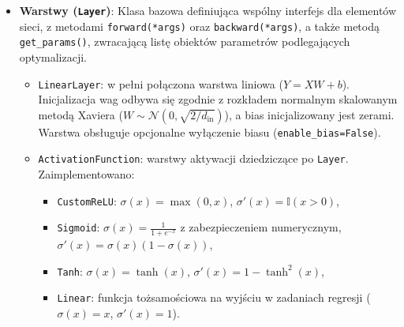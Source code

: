 \documentclass[11pt,a4paper]{article}
\begin{document}
\begin{itemize}
    \item \textbf{Warstwy (\texttt{Layer})}: Klasa bazowa definiująca wspólny interfejs dla elementów sieci, z metodami \texttt{forward(*args)} oraz \texttt{backward(*args)}, a także metodą \texttt{get\_params()}, zwracającą listę obiektów parametrów podlegających optymalizacji.
    \begin{itemize}
        \item \texttt{LinearLayer}: w pełni połączona warstwa liniowa ($Y = XW + b$). Inicjalizacja wag odbywa się zgodnie z rozkładem normalnym skalowanym metodą Xaviera ($W \sim \mathcal{N}(0, \sqrt{2/d_{\text{in}}})$), a bias inicjalizowany jest zerami. Warstwa obsługuje opcjonalne wyłączenie biasu (\texttt{enable\_bias=False}).
        \item \texttt{ActivationFunction}: warstwy aktywacji dziedziczące po \texttt{Layer}. Zaimplementowano:
        \begin{itemize}
            \item \texttt{CustomReLU}: $\sigma(x) = \max(0, x)$, $\sigma'(x) = \mathbb{I}(x > 0)$,
            \item \texttt{Sigmoid}: $\sigma(x) = \frac{1}{1 + e^{-x}}$ z zabezpieczeniem numerycznym, $\sigma'(x) = \sigma(x)(1 - \sigma(x))$,
            \item \texttt{Tanh}: $\sigma(x) = \tanh(x)$, $\sigma'(x) = 1 - \tanh^2(x)$,
            \item \texttt{Linear}: funkcja tożsamościowa na wyjściu w zadaniach regresji ($\sigma(x) = x$, $\sigma'(x) = 1$).
        \end{itemize}
    \end{itemize}


\end{itemize}
\end{document}
